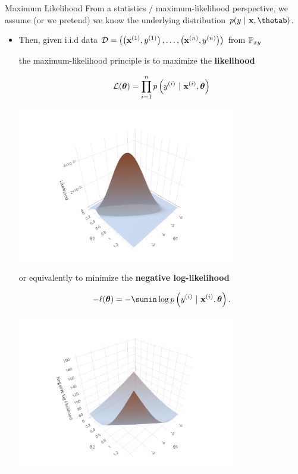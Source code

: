 \documentclass[11pt,compress,t,notes=noshow, xcolor=table]{beamer}
\begin{document}
\begin{vbframe}{Maximum Likelihood}
From a statistics / maximum-likelihood perspective, we assume (or we pretend) we know the underlying distribution $p(y~|~\xv, \thetab)$. 

\begin{itemize}
\item Then, given i.i.d data $
\mathcal{D} = \left( \left(\mathbf{x}^{(1)}, y^{(1)}\right), \ldots, \left(\mathbf{x}^{(n)}, y^{(n)}\right)\right)
$
 from $\mathbb{P}_{xy}$ 

the maximum-likelihood principle is to maximize the \textbf{likelihood}

\begin{minipage}{0.5\textwidth}
$$ \mathcal{L}(\bm{\theta}) = \prod_{i=1}^n p\left(y^{(i)} ~|~\mathbf{x}^{(i)}, \bm{\theta}\right) $$
\end{minipage}%
\begin{minipage}{0.5\textwidth}
\includegraphics[width = 0.75\textwidth]{figure/log_reg_ml.pdf}
\end{minipage}

or equivalently to minimize the \textbf{negative log-likelihood}

\begin{minipage}{0.5\textwidth}
$$ -\loglt = -\sumin \lpdfyigxit. $$
\end{minipage}%
\begin{minipage}{0.5\textwidth}
\includegraphics[width = 0.75\textwidth]{figure/log_reg_erm.pdf}
\end{minipage}
\end{itemize}



\end{vbframe}
\end{document}
